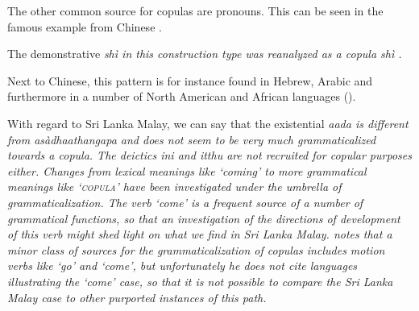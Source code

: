 \documentclass[a4paper,12pt]{article}
\begin{document}



The other common source for copulas are pronouns. This can be seen in the famous example from Chinese \citep{LiEtAl1977cop}.


The demonstrative \em shì \em in this  construction type was reanalyzed as a copula \em shì \em \citep[424]{LiEtAl1977cop}.




Next to Chinese, this pattern is for instance found in Hebrew, Arabic and furthermore in a number of North American and African languages (\citet[77--91]{Stassen1997}).

With regard to Sri Lanka Malay, we can say that the existential \em aada \em is different from \em asàdhaathangapa \em and does not seem to be very much grammaticalized towards a copula. The deictics \em ini \em and \em itthu \em are not recruited for copular purposes either.
Changes from lexical meanings like `coming' to more grammatical meanings like `\textsc{copula}' have been investigated under the umbrella of grammaticalization. The verb `come' is a frequent source of a number of grammatical functions, so that an investigation
of the directions of development of this verb might shed light on what we find in Sri Lanka Malay.  \citet[92]{Stassen1997} notes that a minor class of sources for the grammaticalization of copulas includes motion verbs like `go' and `come', but unfortunately he does not cite languages illustrating the `come' case, so that it is not possible to compare the Sri Lanka Malay case to other purported instances of this path.
\end{document}

